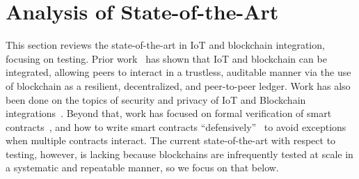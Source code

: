 

\section{Analysis of State-of-the-Art}
\label{stateOfArt}

This section reviews the state-of-the-art in IoT and blockchain integration,  focusing on testing. Prior work~\cite{christidis2016blockchains} has shown that IoT and blockchain can be integrated, allowing peers to interact in a trustless, auditable manner via the use of blockchain as a resilient, decentralized, and peer-to-peer ledger. Work has also been done on the topics of security and privacy of IoT and Blockchain integrations~\cite{dorri2017blockchain,ouaddah2017towards}. Beyond that, work has focused on formal verification of smart contracts~\cite{kumaresan2014use}, and how to write smart contracts ``defensively''~\cite{delmolino2016step} to avoid exceptions when multiple contracts interact. The current state-of-the-art with respect to testing, however, is lacking because blockchains are infrequently tested at scale in a systematic and repeatable manner, so we focus on that below.


% 
% 

